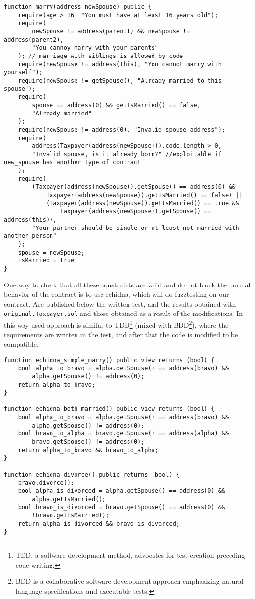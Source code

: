 \documentclass{article}
\begin{document}
\begin{verbatim}
function marry(address newSpouse) public {
    require(age > 16, "You must have at least 16 years old");
    require(
        newSpouse != address(parent1) && newSpouse != address(parent2),
        "You cannoy marry with your parents"
    ); // marriage with siblings is allowed by code
    require(newSpouse != address(this), "You cannot marry with yourself");
    require(newSpouse != getSpouse(), "Already married to this spouse");
    require(
        spouse == address(0) && getIsMarried() == false,
        "Already married"
    );
    require(newSpouse != address(0), "Invalid spouse address");
    require(
        address(Taxpayer(address(newSpouse))).code.length > 0,
        "Invalid spouse, is it already born?" //exploitable if new_spouse has another type of contract
    );
    require(
        (Taxpayer(address(newSpouse)).getSpouse() == address(0) &&
            Taxpayer(address(newSpouse)).getIsMarried() == false) ||
            (Taxpayer(address(newSpouse)).getIsMarried() == true &&
                Taxpayer(address(newSpouse)).getSpouse() == address(this)),
        "Your partner should be single or at least not married with another person"
    );
    spouse = newSpouse;
    isMarried = true;
}
\end{verbatim}
One way to check that all these constraints are valid and do not block the normal behavior of the contract is to use echidna, which will do fuzztesting on our contract. Are published below the written test, and the results obtained with \texttt{original.Taxpayer.sol} and those obtained as a result of the modifications. In this way used approach is similar to TDD\footnote{TDD, a software development method, advocates for test creation preceding code writing.} (mixed with BDD\footnote{BDD is a collaborative software development approach emphasizing natural language specifications and executable tests.}), where the requirements are written in the test, and after that the code is modified to be compatible.

\begin{verbatim}
function echidna_simple_marry() public view returns (bool) {
    bool alpha_to_bravo = alpha.getSpouse() == address(bravo) &&
        alpha.getSpouse() != address(0);
    return alpha_to_bravo;
}

function echidna_both_married() public view returns (bool) {
    bool alpha_to_bravo = alpha.getSpouse() == address(bravo) &&
        alpha.getSpouse() != address(0);
    bool bravo_to_alpha = bravo.getSpouse() == address(alpha) &&
        bravo.getSpouse() != address(0);
    return alpha_to_bravo && bravo_to_alpha;
}

function echidna_divorce() public returns (bool) {
    bravo.divorce();
    bool alpha_is_divorced = alpha.getSpouse() == address(0) &&
        alpha.getIsMarried();
    bool bravo_is_divorced = bravo.getSpouse() == address(0) &&
        !bravo.getIsMarried();
    return alpha_is_divorced && bravo_is_divorced;
}
\end{verbatim} 
\end{document}

